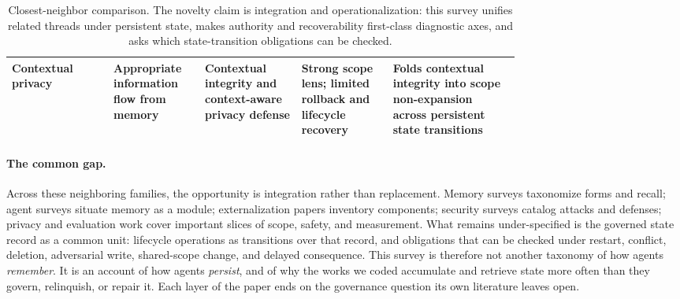 \begin{table}[t]
\begin{tabularx}{\linewidth}{p{0.20\linewidth}p{0.18\linewidth}p{0.19\linewidth}p{0.18\linewidth}Y}
Contextual privacy \citep{mireshghallah2025cimemories,wen2026contextualizedprivacy} & Appropriate information flow from memory & Contextual integrity and context-aware privacy defense & Strong scope lens; limited rollback and lifecycle recovery & Folds contextual integrity into scope non-expansion across persistent state transitions \\
\bottomrule
\end{tabularx}
\caption{Closest-neighbor comparison. The novelty claim is integration and operationalization: this survey unifies related threads under persistent state, makes authority and recoverability first-class diagnostic axes, and asks which state-transition obligations can be checked.}
\label{tab:closest-surveys}
\end{table}

\paragraph{The common gap.} Across these neighboring families, the opportunity is integration rather than replacement. Memory surveys taxonomize forms and recall; agent surveys situate memory as a module; externalization papers inventory components; security surveys catalog attacks and defenses; privacy and evaluation work cover important slices of scope, safety, and measurement. What remains under-specified is the governed state record as a common unit: lifecycle operations as transitions over that record, and obligations that can be checked under restart, conflict, deletion, adversarial write, shared-scope change, and delayed consequence. This survey is therefore not another taxonomy of how agents \emph{remember}. It is an account of how agents \emph{persist}, and of why the works we coded accumulate and retrieve state more often than they govern, relinquish, or repair it. Each layer of the paper ends on the governance question its own literature leaves open.
